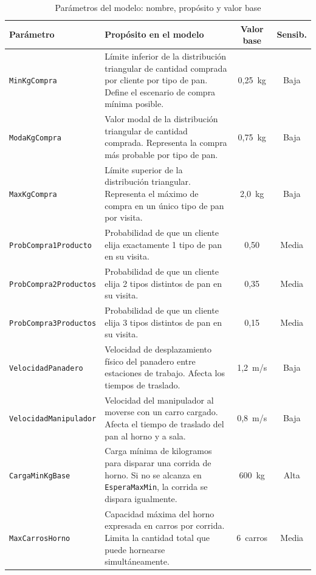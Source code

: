 \documentclass[12pt]{article}
\begin{document}
\begin{table}[H]
\centering
\caption{Parámetros del modelo: nombre, propósito y valor base}
\label{tab:parametros-modelo}
\renewcommand{\arraystretch}{1.3}
\begin{tabularx}{\textwidth}{lXcc}
\toprule
\rowcolor{tabhead}
\color{white}\textbf{Parámetro} &
\color{white}\textbf{Propósito en el modelo} &
\color{white}\textbf{Valor base} &
\color{white}\textbf{Sensib.} \\
\midrule
\rowcolor{tabrow}\texttt{MinKgCompra}            & Límite inferior de la distribución triangular de cantidad comprada por cliente por tipo de pan. Define el escenario de compra mínima posible. & 0,25~kg & Baja \\
\texttt{ModaKgCompra}           & Valor modal de la distribución triangular de cantidad comprada. Representa la compra más probable por tipo de pan. & 0,75~kg & Baja \\
\rowcolor{tabrow}\texttt{MaxKgCompra}            & Límite superior de la distribución triangular. Representa el máximo de compra en un único tipo de pan por visita. & 2,0~kg & Baja \\
\texttt{ProbCompra1Producto}    & Probabilidad de que un cliente elija exactamente 1 tipo de pan en su visita. & 0,50 & Media \\
\rowcolor{tabrow}\texttt{ProbCompra2Productos}   & Probabilidad de que un cliente elija 2 tipos distintos de pan en su visita. & 0,35 & Media \\
\texttt{ProbCompra3Productos}   & Probabilidad de que un cliente elija 3 tipos distintos de pan en su visita. & 0,15 & Media \\
\rowcolor{tabrow}\texttt{VelocidadPanadero}      & Velocidad de desplazamiento físico del panadero entre estaciones de trabajo. Afecta los tiempos de traslado. & 1,2~m/s & Baja \\
\texttt{VelocidadManipulador}   & Velocidad del manipulador al moverse con un carro cargado. Afecta el tiempo de traslado del pan al horno y a sala. & 0,8~m/s & Baja \\
\rowcolor{tabrow}\texttt{CargaMinKgBase}         & Carga mínima de kilogramos para disparar una corrida de horno. Si no se alcanza en \texttt{EsperaMaxMin}, la corrida se dispara igualmente. & 600~kg & Alta \\
\texttt{MaxCarrosHorno}         & Capacidad máxima del horno expresada en carros por corrida. Limita la cantidad total que puede hornearse simultáneamente. & 6~carros & Media \\

\end{tabularx}
\end{table}
\end{document}

